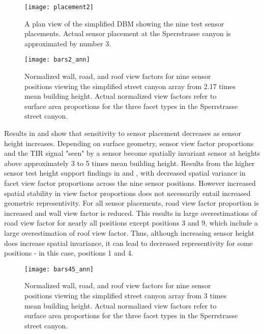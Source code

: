 \begin{bibunit}
 \begin{figure}[H]
	\centering
	\texttt{[image: placement2]}
	\caption{A plan view of the simplified DBM showing the nine test sensor placements. Actual sensor placement at the Sperrstrasse canyon is approximated by number 3.}
	\label{placement}
\end{figure}

 \begin{figure}[H]
	\centering
	\texttt{[image: bars2\_ann]}
	\caption{Normalized wall, road, and roof view factors for nine sensor positions viewing the simplified street canyon array from 2.17 times mean building height. Actual normalized view factors refer to surface area proportions for the three facet types in the Sperrstrasse street canyon. }
	\label{bars1}
 \end{figure}

Results in \citet{Adderley2015} and \citet{Roberts2010} show that sensitivity to sensor placement decreases as sensor height increases. Depending on surface geometry, sensor view factor proportions and the TIR signal "seen" by a sensor become spatially invariant sensor at heights above approximately 3 to 5 times mean building height. Results from the higher sensor test height support findings in \citet{Adderley2015} and \citet{Roberts2010}, with decreased spatial variance in facet view factor proportions across the nine sensor positions. However increased spatial stability in view factor proportions does not necessarily entail increased geometric representivity. For all sensor placements, road view factor proportion is increased and wall view factor is reduced. This results in large overestimations of road view factor for nearly all positions except positions 3 and 9, which include a large overestimation of roof view factor. Thus, although increasing sensor height does increase spatial invariance, it can lead to decreased representivity for some positions - in this case, positions 1 and 4.

\begin{figure}[H]
	\centering
	\texttt{[image: bars45\_ann]}
	\caption{Normalized wall, road, and roof view factors for nine sensor positions viewing the simplified street canyon array from 3 times mean building height. Actual normalized view factors refer to surface area proportions for the three facet types in the Sperrstrasse street canyon. }
	\label{bars45}
\end{figure}


\end{bibunit}
